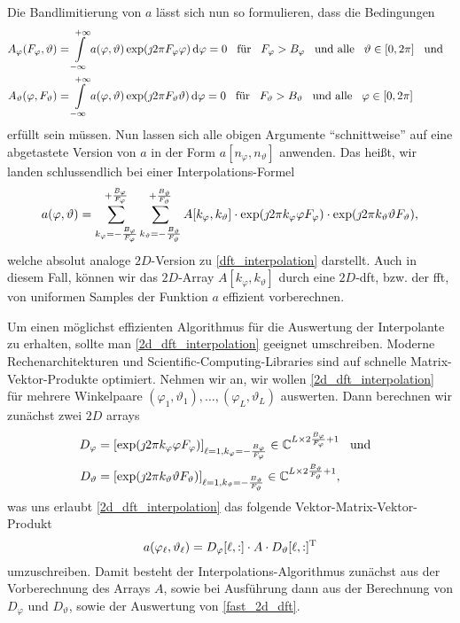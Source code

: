 Die Bandlimitierung von $a$ l\"asst sich nun so formulieren, dass die Bedingungen
\begin{align}
    A_{\varphi}(F_\varphi, \vartheta) 
    &= {\int\limits_{-\infty}^{+\infty}{
        a(\varphi, \vartheta) \exp(\jmath 2 \pi F_\varphi \varphi)
    }\,\mathrm{d}{\varphi}} = 0 
    {\hspace{3mm} \text{f\"ur} \hspace{3mm}} F_\varphi > B_\varphi {\hspace{3mm} \text{und alle} \hspace{3mm}} \vartheta \in [0, 2 \pi] {\hspace{3mm} \text{und} \hspace{3mm}} \\
    A_{\vartheta}(\varphi, F_\vartheta) 
    &= {\int\limits_{-\infty}^{+\infty}{
        a(\varphi, \vartheta) \exp(\jmath 2 \pi F_\vartheta \vartheta)
    }\,\mathrm{d}{\varphi}} = 0 
    {\hspace{3mm} \text{f\"ur} \hspace{3mm}} F_\vartheta > B_\vartheta {\hspace{3mm} \text{und alle} \hspace{3mm}} \varphi \in [0, 2 \pi]
\end{align}
erf\"ullt sein m\"ussen. Nun lassen sich alle obigen Argumente ``schnittweise'' auf eine abgetastete Version von $a$ in der Form $a[n_\varphi, n_\vartheta]$ anwenden. Das hei{\ss}t, wir landen schlussendlich bei einer Interpolations-Formel
\begin{equation}\label{2d_dft_interpolation}
    a(\varphi, \vartheta) = {\sum\limits_{k_\varphi=-\frac{B_\varphi}{F_\varphi}}^{+\frac{B_\varphi}{F_\varphi}}{
        {\sum\limits_{k_\vartheta=-\frac{B_\vartheta}{F_\vartheta}}^{+\frac{B_\vartheta}{F_\vartheta}}{
            A[k_\varphi, k_\vartheta] 
            \cdot \exp(\jmath 2 \pi k_\varphi \varphi F_\varphi)
            \cdot \exp(\jmath 2 \pi k_\vartheta \vartheta F_\vartheta)
        }}
    }},
\end{equation}
welche absolut analoge $2D$-Version zu \eqref{dft_interpolation} darstellt. Auch in diesem Fall, k\"onnen wir das $2D$-Array $A[k_\varphi, k_\vartheta]$ durch eine $2D$-\gls{dft}, bzw. der \gls{fft}, von uniformen Samples der Funktion $a$ effizient vorberechnen.

Um einen m\"oglichst effizienten Algorithmus f\"ur die Auswertung der Interpolante zu erhalten, sollte man \eqref{2d_dft_interpolation} geeignet umschreiben. Moderne Rechenarchitekturen und Scientific-Computing-Libraries sind auf schnelle Matrix-Vektor-Produkte optimiert. Nehmen wir an, wir wollen \eqref{2d_dft_interpolation} f\"ur mehrere Winkelpaare $(\varphi_1, \vartheta_1), \dots, (\varphi_L, \vartheta_L)$ auswerten. Dann berechnen wir zun\"achst zwei $2D$ arrays
\begin{align}
    D_\varphi &= [\exp(\jmath 2 \pi k_\varphi \varphi F_\varphi)]_{\ell = 1, k_\varphi=-\frac{B_\varphi}{F_\varphi}} \in \mathbb{C}^{L \times 2 \frac{B_\varphi}{F_\varphi} + 1} {\hspace{3mm} \text{und} \hspace{3mm}}\\
    D_\vartheta &= [\exp(\jmath 2 \pi k_\vartheta \vartheta F_\vartheta)]_{\ell = 1, k_\vartheta=-\frac{B_\vartheta}{F_\vartheta}} \in \mathbb{C}^{L \times 2 \frac{B_\vartheta}{F_\vartheta} + 1}, 
\end{align}
was uns erlaubt \eqref{2d_dft_interpolation} das folgende Vektor-Matrix-Vektor-Produkt
\begin{equation}\label{fast_2d_dft}
    a(\varphi_\ell, \vartheta_\ell) = 
        D_\varphi[\ell, :] \cdot A \cdot D_\vartheta[\ell, :]^{\mathrm{T}}
\end{equation}
umzuschreiben. Damit besteht der Interpolations-Algorithmus zun\"achst aus der Vorberechnung des Arrays $A$, sowie bei Ausf\"uhrung dann aus der Berechnung von $D_\varphi$ und $D_\vartheta$, sowie der Auswertung von \eqref{fast_2d_dft}.

